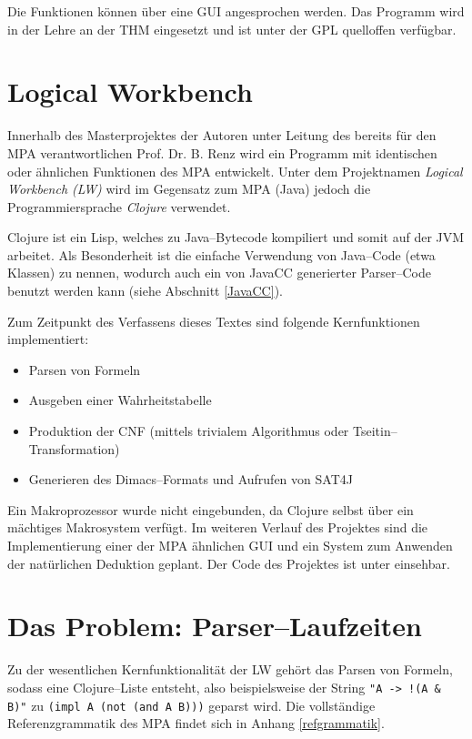 \documentclass[ngerman,a4paper,abstracton,open=right,twoside=false,toc=listofnumbered,bibtotocnumbered]{scrreprt}
\begin{document}
Die Funktionen können über eine GUI angesprochen werden. Das Programm wird in der Lehre an der THM eingesetzt und ist unter der GPL quelloffen verfügbar.

\section{Logical Workbench}

Innerhalb des Masterprojektes der Autoren unter Leitung des bereits für den MPA verantwortlichen Prof. Dr. B. Renz wird ein Programm mit identischen oder ähnlichen Funktionen des MPA entwickelt. Unter dem Projektnamen \emph{Logical Workbench (LW)} wird im Gegensatz zum MPA (Java) jedoch die Programmiersprache \emph{Clojure} verwendet.

Clojure ist ein Lisp, welches zu Java--Bytecode kompiliert und somit auf der JVM arbeitet. Als Besonderheit ist die einfache Verwendung von Java--Code (etwa Klassen) zu nennen, wodurch auch ein von JavaCC generierter Parser--Code benutzt werden kann (siehe Abschnitt \ref{JavaCC}).

Zum Zeitpunkt des Verfassens dieses Textes sind folgende Kernfunktionen implementiert:

\begin{itemize}
	\item Parsen von Formeln
	\item Ausgeben einer Wahrheitstabelle
	\item Produktion der CNF (mittels trivialem Algorithmus oder Tseitin--Transformation)
	\item Generieren des Dimacs--Formats und Aufrufen von SAT4J
\end{itemize}

Ein Makroprozessor wurde nicht eingebunden, da Clojure selbst über ein mächtiges Makrosystem verfügt. Im weiteren Verlauf des Projektes sind die Implementierung einer der MPA ähnlichen GUI und ein System zum Anwenden der natürlichen Deduktion geplant. Der Code des Projektes ist unter \cite{lw} einsehbar.

\section{Das Problem: Parser--Laufzeiten}

Zu der wesentlichen Kernfunktionalität der LW gehört das Parsen von Formeln, sodass eine Clojure--Liste entsteht, also beispielsweise der String \lstinline|"A -> !(A & B)"| zu \lstinline|(impl A (not (and A B)))| geparst wird. Die vollständige Referenzgrammatik des MPA findet sich in Anhang \ref{refgrammatik}.\\
\end{document}
